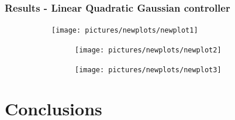 \documentclass{beamer}
\begin{document}
%
%

\begin{frame}
\frametitle{Results - Linear Quadratic Gaussian controller}

\vspace{-0.3cm}
\begin{figure}[p]
\begin{subfigure}[p]{0.5\textwidth}
\texttt{[image: pictures/newplots/newplot1]}
\end{subfigure}
\hfill
\begin{subfigure}[p]{0.45\textwidth}
\begin{subfigure}[t]{\textwidth}
\texttt{[image: pictures/newplots/newplot2]}
\end{subfigure}
\vfill
\begin{subfigure}[b]{\textwidth}
\vspace{-0.3cm}
\texttt{[image: pictures/newplots/newplot3]}
\end{subfigure}
\end{subfigure}

\end{figure}
\end{frame}

\section{Conclusions}
\end{document}
